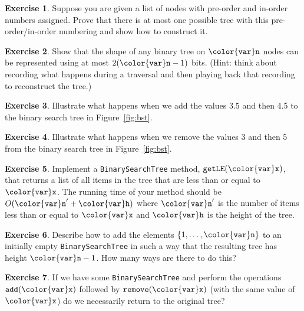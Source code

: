 \documentclass[10pt]{book}
\newcommand{\figref}[1]{Figure~\ref{fig:#1}}
\theoremstyle{plain}
\theoremstyle{definition}
\newtheorem{exc}{Exercise}[chapter]
\begin{document}
\begin{exc}
  Suppose you are given a list of nodes with pre-order and in-order
  numbers assigned.  Prove that there is at most one possible tree with
  this pre-order/in-order numbering and show how to construct it.
\end{exc}

\begin{exc}
  Show that the shape of any binary tree on \ensuremath{\mathtt{{\color{var}n}}} nodes can be represented
  using at most $2(\ensuremath{\mathtt{{\color{var}n}}}-1)$ bits.  (Hint: think about recording what
  happens during a traversal and then playing back that recording to
  reconstruct the tree.)
\end{exc}

\begin{exc}
  Illustrate what happens when we add the values $3.5$ and then 4.5 to
  the binary search tree in \figref{bst}.
\end{exc}

\begin{exc}
  Illustrate what happens when we remove the values $3$ and then 5 from
  the binary search tree in \figref{bst}.
\end{exc}

\begin{exc}
  Implement a \texttt{BinarySearchTree} method, \ensuremath{\mathtt{getLE({\color{var}x})}},
  that returns a list of all items in the tree that are less than or
  equal to \ensuremath{\mathtt{{\color{var}x}}}.  The running time of your method should be $O(\ensuremath{\mathtt{{\color{var}n}}}'+\ensuremath{\mathtt{{\color{var}h}}})$
  where $\ensuremath{\mathtt{{\color{var}n}}}'$ is the number of items less than or equal to \ensuremath{\mathtt{{\color{var}x}}} and \ensuremath{\mathtt{{\color{var}h}}}
  is the height of the tree.
\end{exc}

\begin{exc}
  Describe how to add the elements $\{1,\ldots,\ensuremath{\mathtt{{\color{var}n}}}\}$ to an initially
  empty \texttt{BinarySearchTree} in such a way that the resulting tree has
  height $\ensuremath{\mathtt{{\color{var}n}}}-1$.  How many ways are there to do this?
\end{exc}

\begin{exc}
  If we have some \texttt{BinarySearchTree} and perform the operations \ensuremath{\mathtt{add({\color{var}x})}}
  followed by \ensuremath{\mathtt{remove({\color{var}x})}} (with the same value of \ensuremath{\mathtt{{\color{var}x}}}) do we necessarily
  return to the original tree?
\end{exc}
\end{document}
